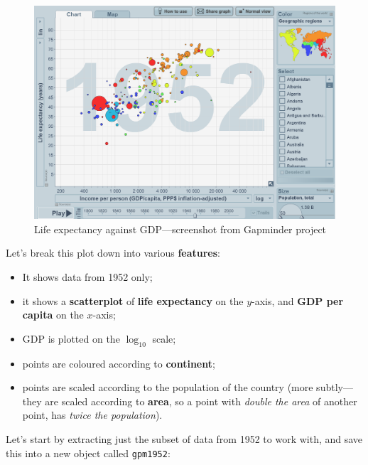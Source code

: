 \documentclass[]{book}
\newenvironment{Shaded}{\begin{snugshade}}{\end{snugshade}}
\newcommand{\DecValTok}[1]{\textcolor[rgb]{0.00,0.00,0.81}{{#1}}}
\newcommand{\StringTok}[1]{\textcolor[rgb]{0.31,0.60,0.02}{{#1}}}
\newcommand{\NormalTok}[1]{{#1}}
\providecommand{\tightlist}{%
  \setlength{\itemsep}{0pt}\setlength{\parskip}{0pt}}
\theoremstyle{definition}
\theoremstyle{definition}
\theoremstyle{definition}
\theoremstyle{remark}
\begin{document}
\begin{figure}

{\centering \includegraphics{images/gapminder} 

}

\caption{Life expectancy against GDP---screenshot from Gapminder project}\label{fig:gapminder}
\end{figure}

Let's break this plot down into various \textbf{features}:

\begin{itemize}
\tightlist
\item
  It shows data from 1952 only;
\item
  it shows a \textbf{scatterplot} of \textbf{life expectancy} on the
  \(y\)-axis, and \textbf{GDP per capita} on the \(x\)-axis;
\item
  GDP is plotted on the \textbf{\(\log_{10}\)} scale;
\item
  points are coloured according to \textbf{continent};
\item
  points are scaled according to the population of the country (more
  subtly---they are scaled according to \textbf{area}, so a point with
  \emph{double the area} of another point, has \emph{twice the
  population}).
\end{itemize}

Let's start by extracting just the subset of data from 1952 to work
with, and save this into a new object called \texttt{gpm1952}:

\begin{Shaded}
\end{Shaded}
\end{document}
